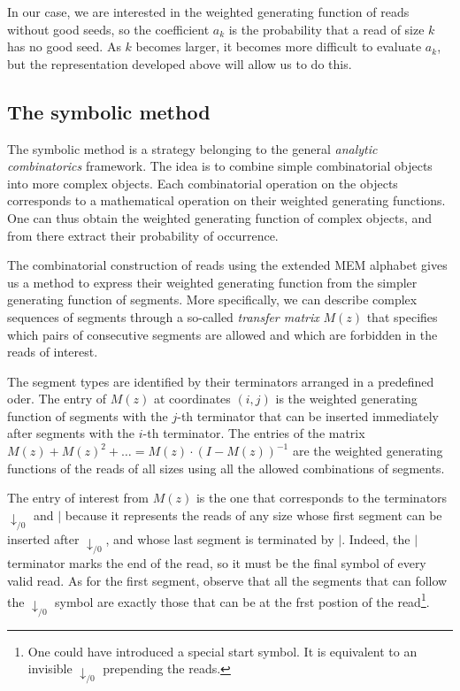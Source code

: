 \documentclass{article}
\begin{document}
In our case, we are interested in the weighted generating function of
reads without good seeds, so the coefficient $a_k$ is the probability
that a read of size $k$ has no good seed. As $k$ becomes larger,
it becomes more difficult to evaluate $a_k$, but the representation
developed above will allow us to do this.


\subsection{The symbolic method}

The symbolic method is a strategy belonging to the general \emph{analytic
combinatorics} framework. The idea is to combine simple combinatorial
objects into more complex objects. Each combinatorial operation on the
objects corresponds to a mathematical operation on their weighted
generating functions. One can thus obtain the weighted generating function
of complex objects, and from there extract their probability of
occurrence.

The combinatorial construction of reads using the extended MEM alphabet
gives us a method to express their weighted generating function from the
simpler generating function of segments. More specifically, we can
describe complex sequences of segments through a so-called \emph{transfer
matrix} $M(z)$ that specifies which pairs of consecutive segments are
allowed and which are forbidden in the reads of interest.

The segment types are identified by their terminators arranged in a
predefined oder. The entry of $M(z)$ at coordinates $(i,j)$ is the
weighted generating function of segments with the $j$-th terminator that
can be inserted immediately after segments with the $i$-th terminator. The
entries of the matrix $M(z) + M(z)^2 + \ldots = M(z) \cdot (I-M(z))^{-1}$
are the weighted generating functions of the reads of all sizes using all
the allowed combinations of segments.

The entry of interest from $M(z)$ is the one that corresponds to the
terminators $\downarrow_{/0}$ and $|$ because it represents the reads of
any size whose first segment can be inserted after $\downarrow_{/0}$, and
whose last segment is terminated by $|$. Indeed, the $|$ terminator marks
the end of the read, so it must be the final symbol of every valid read.
As for the first segment, observe that all the segments that can follow
the $\downarrow_{/0}$ symbol are exactly those that can be at the frst
postion of the read\footnote{One could have introduced a special start
symbol. It is equivalent to an invisible $\downarrow_{/0}$ prepending
the reads.}.
\end{document}
